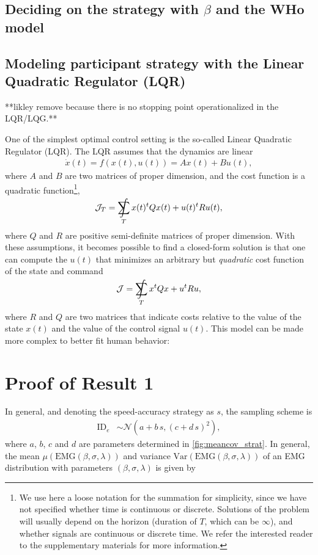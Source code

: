 \documentclass[12pt,a4paper]{article}
\DeclareMathOperator*{\SumInt}{%
\mathchoice%
  {\ooalign{$\displaystyle\sum$\cr\hidewidth$\displaystyle\int$\hidewidth\cr}}
  {\ooalign{\raisebox{.14\height}{\scalebox{.7}{$\textstyle\sum$}}\cr\hidewidth$\textstyle\int$\hidewidth\cr}}
  {\ooalign{\raisebox{.2\height}{\scalebox{.6}{$\scriptstyle\sum$}}\cr$\scriptstyle\int$\cr}}
  {\ooalign{\raisebox{.2\height}{\scalebox{.6}{$\scriptstyle\sum$}}\cr$\scriptstyle\int$\cr}}
}
\begin{document}
\subsection{Deciding on the strategy with $\beta$ and the WHo model}


\subsection{Modeling participant strategy with the Linear Quadratic Regulator (LQR) \label{sub:lqr}}

**likley remove because there is no stopping point operationalized in the LQR/LQG.**

One of the simplest optimal control setting is the so-called Linear Quadratic Regulator (LQR). The LQR assumes that the dynamics are linear
\begin{align}
	\dot{x}(t) = f(x(t),u(t)) = Ax(t) + Bu(t),
\end{align}
where $A$ and $B$ are two matrices of proper dimension, and the cost function is a quadratic function\footnote{We use here a loose notation for the summation for simplicity, since we have not specified whether time is continuous or discrete. Solutions of the problem will usually depend on the horizon (duration of $T$, which can be $\infty$), and whether signals are continuous or discrete time. We refer the interested reader to the supplementary materials for more information.},
\begin{align}
	\mathcal{J}_T = \SumInt_T x(t)^tQx(t) + u(t)^tRu(t),
\end{align}
where $Q$ and $R$ are positive semi-definite matrices of proper dimension. With these assumptions, it becomes possible to find a closed-form solution  is that one can compute the $u(t)$ that minimizes an arbitrary but \textit{quadratic} cost function of the state and command
\begin{align}
	\mathcal{J} = \SumInt_T x^tQx + u^tRu,
\end{align}
where $R$ and $Q$ are two matrices that indicate costs relative to the value of the state $x(t)$ and the value of the control signal $u(t)$.
This model can be made more complex to better fit human behavior:


\appendix

\section{Proof of Result 1 \label{proof:result1}}
In general, and denoting the speed-accuracy strategy as $s$, the sampling scheme is
\begin{align}
	\text{ID}_e & \sim \mathcal{N}(a + b\,s, (c + d\,s)^2),
\end{align}
where $a$, $b$, $c$ and $d$ are parameters determined in \autoref{fig:meancov_strat}.
In general, the mean $\mu(\text{EMG}(\beta, \sigma, \lambda))$ and variance $\text{Var}(\text{EMG}(\beta, \sigma, \lambda))$ of an EMG distribution with parameters $(\beta, \sigma, \lambda)$ is given by
\end{document}

